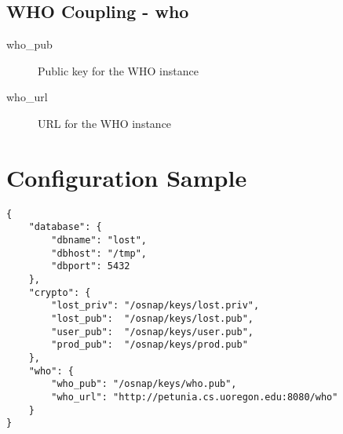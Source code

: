 \subsection*{WHO Coupling - who}
\begin{description}
\item[who\_pub]  Public key for the WHO instance
\item[who\_url]  URL for the WHO instance
\end{description}

\section*{Configuration Sample}
\begin{verbatim}
{
    "database": {
        "dbname": "lost",
        "dbhost": "/tmp",
        "dbport": 5432
    },
    "crypto": {
        "lost_priv": "/osnap/keys/lost.priv",
        "lost_pub":  "/osnap/keys/lost.pub",
        "user_pub":  "/osnap/keys/user.pub",
        "prod_pub":  "/osnap/keys/prod.pub"
    },
    "who": {
        "who_pub": "/osnap/keys/who.pub",
        "who_url": "http://petunia.cs.uoregon.edu:8080/who"
    }
}
\end{verbatim}
